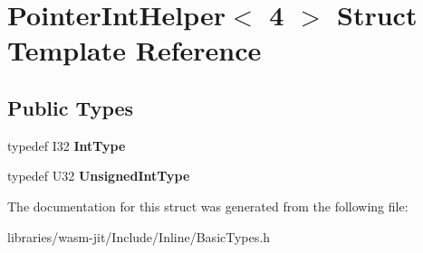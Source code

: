 \hypertarget{struct_pointer_int_helper_3_014_01_4}{}\section{Pointer\+Int\+Helper$<$ 4 $>$ Struct Template Reference}
\label{struct_pointer_int_helper_3_014_01_4}
\subsection*{Public Types}
\begin{DoxyCompactItemize}
\item 
\mbox{\label{struct_pointer_int_helper_3_014_01_4_a8fa7b514ba8932efff175d292a6c3898}} 
typedef I32 {\bfseries Int\+Type}
\item 
\mbox{\label{struct_pointer_int_helper_3_014_01_4_a9a613c5012dfc9e7dcbe6476e01bfa7a}} 
typedef U32 {\bfseries Unsigned\+Int\+Type}
\end{DoxyCompactItemize}


The documentation for this struct was generated from the following file\+:\begin{DoxyCompactItemize}
\item 
libraries/wasm-\/jit/\+Include/\+Inline/Basic\+Types.\+h\end{DoxyCompactItemize}
